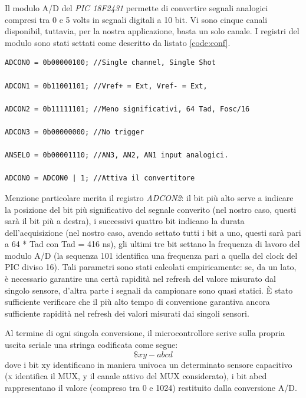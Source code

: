 \documentclass[12pt,a4paper,oneside,openright,italian]{article}
\begin{document}
Il modulo A/D del \emph{PIC 18F2431} permette di convertire segnali analogici compresi tra 0 e 5 volts in segnali digitali a 10 bit. Vi sono cinque canali disponibil, tuttavia, per la nostra applicazione, basta un solo canale. I registri del modulo sono stati settati come descritto da listato \ref{code:conf}.

\begin{lstlisting}[caption={Configurazione dei registri del modulo A/D}, label={code:conf},frame=trBL]
ADCON0 = 0b00000100; //Single channel, Single Shot

ADCON1 = 0b11001101; //Vref+ = Ext, Vref- = Ext, 

ADCON2 = 0b11111101; //Meno significativi, 64 Tad, Fosc/16

ADCON3 = 0b00000000; //No trigger

ANSEL0 = 0b00001110; //AN3, AN2, AN1 input analogici.

ADCON0 = ADCON0 | 1; //Attiva il convertitore
\end{lstlisting}

Menzione particolare merita il registro \emph{ADCON2}: il bit pi\`u alto serve a indicare la posizione del bit pi\`u significativo del segnale converito (nel nostro caso, questi sar\`a il bit pi\`u a destra), i successivi quattro bit indicano la durata dell'acquisizione (nel nostro caso, avendo settato tutti i bit a uno, questi sar\`a pari a 64 * Tad con Tad = 416 ns), gli ultimi tre bit settano la frequenza di lavoro del modulo A/D (la sequenza 101 identifica una frequenza pari a quella del clock del PIC diviso 16). Tali parametri sono stati calcolati empiricamente: se, da un lato, \`e necessario garantire una cert\`a rapidit\`a nel refresh del valore misurato dal singolo sensore, d'altra parte i segnali da campionare sono quasi statici. \`E stato sufficiente verificare che il pi\`u alto tempo di conversione garantiva ancora sufficiente rapidit\`a nel refresh dei valori misurati dai singoli sensori.

Al termine di ogni singola conversione, il microcontrollore scrive sulla propria uscita seriale una stringa codificata come segue:
\begin{equation}
  \$xy-abcd
\end{equation}
dove i bit xy identificano in maniera univoca un determinato sensore capacitivo (x identifica il MUX, y il canale attivo del MUX considerato), i bit abcd rappresentano il valore (compreso tra 0 e 1024) restituito dalla conversione A/D.
\end{document}

